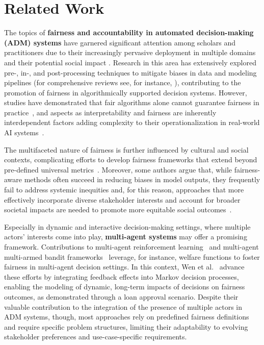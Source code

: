 \section{Related Work}
\label{sec:related}
The topics of \textbf{fairness and accountability in automated decision-making (ADM) systems} have garnered significant attention among scholars and practitioners due to their increasingly pervasive deployment in multiple domains \citep{chiusi2020automating} and their potential social impact \citep{araujo2020ai}. Research in this area has extensively explored pre-, in-, and post-processing techniques to mitigate biases in data and modeling pipelines (for comprehensive reviews see, for instance, \cite{mehrabi2021survey, pessach2022review}), contributing to the promotion of fairness in algorithmically supported decision systems. However, studies have demonstrated that fair algorithms alone cannot guarantee fairness in practice~\citep{goel2021importance, jeong2022fairness}, and aspects as interpretability and fairness are inherently interdependent factors adding complexity to their operationalization in real-world AI systems~\citep{dodge2019explaining, schoeffer2022relationship, ramachandranpillai2023fairxai, jain2020biased}.

The multifaceted nature of fairness is further influenced by cultural and social contexts, complicating efforts to develop fairness frameworks that extend beyond pre-defined universal metrics~\citep{selbst2019fairness}. Moreover, some authors argue that, while fairness-aware methods often succeed in reducing biases in model outputs, they frequently fail to address systemic inequities and, for this reason, approaches that more effectively incorporate diverse stakeholder interests and account for broader societal impacts are needed to promote more equitable social outcomes~\citep{gerdes2022participatory}.

Especially in dynamic and interactive decision-making settings, where multiple actors’ interests come into play, \textbf{multi-agent systems} may offer a promising framework. Contributions to multi-agent reinforcement learning~\citep{zimmer2021learning} and multi-agent multi-armed bandit frameworks~\citep{hossain2021fair} leverage, for instance, welfare functions to foster fairness in multi-agent decision settings. In this context, Wen et al.~\citep{wen2021algorithms} advance these efforts by integrating feedback effects into Markov decision processes, enabling the modeling of dynamic, long-term impacts of decisions on fairness outcomes, as demonstrated through a loan approval scenario. Despite their valuable contribution to the integration of the presence of multiple actors in ADM systems, though, most approaches rely on predefined fairness definitions and require specific problem structures, limiting their adaptability to evolving stakeholder preferences and use-case-specific requirements.

